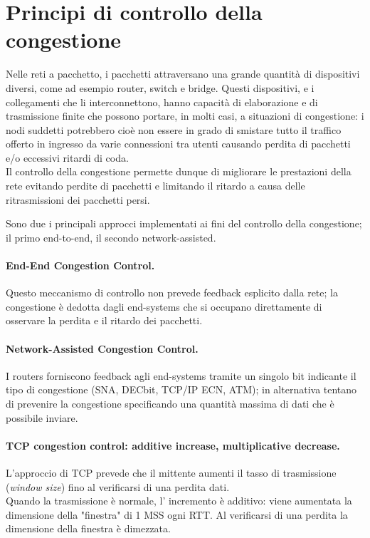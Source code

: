 \section{Principi di controllo della congestione}
Nelle reti a pacchetto, i pacchetti attraversano una grande quantità di dispositivi diversi, come ad esempio router, switch e bridge. Questi dispositivi, e i collegamenti che li interconnettono, hanno capacità di elaborazione e di trasmissione finite che possono portare, in molti casi, a situazioni di congestione: i nodi suddetti potrebbero cioè non essere in grado di smistare tutto il traffico offerto in ingresso da varie connessioni tra utenti causando perdita di pacchetti e/o eccessivi ritardi di coda.\\
Il controllo della congestione permette dunque di migliorare le prestazioni della rete evitando perdite di pacchetti e limitando il ritardo a causa delle ritrasmissioni dei pacchetti persi.

Sono due i principali approcci implementati ai fini del controllo della congestione; il primo end-to-end, il secondo network-assisted.

\paragraph{End-End Congestion Control.}
Questo meccanismo di controllo non prevede feedback esplicito dalla rete; la congestione è dedotta dagli end-systems che si occupano direttamente di osservare la perdita e il ritardo dei pacchetti.
\paragraph{Network-Assisted Congestion Control.} I routers forniscono feedback agli end-systems tramite un singolo bit indicante il tipo di congestione %
(SNA, DECbit, TCP/IP ECN, ATM); in alternativa tentano di prevenire la congestione specificando una quantità massima di dati che è possibile inviare.\\

\paragraph{TCP congestion control: additive increase, multiplicative decrease.}
L'approccio di TCP prevede che il mittente aumenti il tasso di trasmissione (\textit{window size}) fino al verificarsi di una perdita dati.\\
Quando la trasmissione è normale, l' incremento è additivo: viene aumentata la dimensione della "finestra" di 1 MSS ogni RTT.
Al verificarsi di una perdita la dimensione della finestra è dimezzata.


